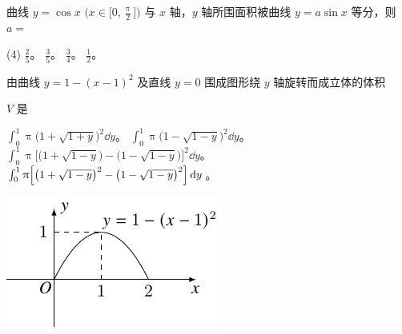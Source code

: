 \begin{ti}
	曲线 $y = \cos x$ $\biggl(x \in \biggl[ 0,\frac{\uppi}{2} \biggr]\biggr)$ 与 $x$ 轴，$y$ 轴所围面积被曲线 $y = a \sin x$ 等分，则 $a = $
	\begin{tasks}(4)
		\task $\frac{2}{5}$。
		\task $\frac{3}{5}$。
		\task $\frac{3}{4}$。
		\task $\frac{1}{2}$。
	\end{tasks}
\end{ti}

\begin{ti}
	由曲线 $y = 1 - (x-1)^2$ 及直线 $y=0$ 围成图形绕 $y$ 轴旋转而成立体的体积\vspace{-8bp}\newline%
	\parbox[t]{0.61\textwidth}{\vspace{0pt}%
	 $V$ 是
	\begin{tasks}
		\task $\int_0^1 \uppi \bigl( 1 + \sqrt{1+y} \bigr)^2 \dd{y}$。
		\task $\int_0^1 \uppi \bigl( 1 - \sqrt{1-y} \bigr)^2 \dd{y}$。
		\task $\int_0^1 \uppi \bigl[ \bigl(1 + \sqrt{1-y}\bigr) - \bigl( 1 - \sqrt{1-y} \bigr) \bigr]^2 \dd{y}$。
		\task $\int_0^1 \uppi \Bigl[ \bigl(1 + \sqrt{1-y}\bigr)^2 - \bigl( 1 - \sqrt{1-y} \bigr)^2 \Bigr] \dd{y}$。
	\end{tasks}
	}%
	\begin{varwidth}[t]{\textwidth}
		\vspace{0pt}\includegraphics{figure/fig206.pdf}
	\end{varwidth}
\end{ti}